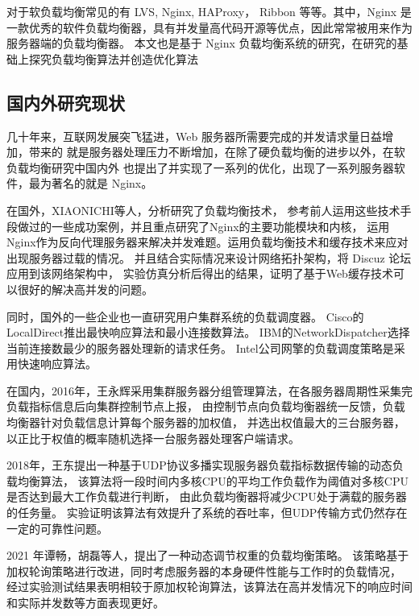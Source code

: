 对于软负载均衡常见的有 LVS\cite{lijp}, Nginx\cite{Zepeng}, HAProxy\cite{li2019dynamic}， Ribbon 等等。其中，Nginx 是一款优秀的软件负载均衡器，具有并发量高代码开源等优点，因此常常被用来作为服务器端的负载均衡器。
本文也是基于 Nginx 负载均衡系统的研究，在研究的基础上探究负载均衡算法并创造优化算法

\subsection{国内外研究现状}

几十年来，互联网发展突飞猛进，Web 服务器所需要完成的并发请求量日益增加，带来的
就是服务器处理压力不断增加，在除了硬负载均衡的进步以外，在软负载均衡研究中国内外
也提出了并实现了一系列的优化，出现了一系列服务器软件，最为著名的就是 Nginx。

在国外，XIAONICHI等人\cite{chi2012web}，分析研究了负载均衡技术，
参考前人运用这些技术手段做过的一些成功案例，并且重点研究了Nginx的主要功能模块和内核，
运用Nginx作为反向代理服务器来解决并发难题。运用负载均衡技术和缓存技术来应对出现服务器过载的情况。
并且结合实际情况来设计网络拓扑架构，将 Discuz 论坛应用到该网络架构中，
实验仿真分析后得出的结果，证明了基于Web缓存技术可以很好的解决高并发的问题。

同时，国外的一些企业也一直研究用户集群系统的负载调度器。
Cisco的LocalDirect推出最快响应算法和最小连接数算法。
IBM的NetworkDispatcher选择当前连接数最少的服务器处理新的请求任务。
Intel公司网擎的负载调度策略是采用快速响应算法\cite{张淇2020服务器集群负载均衡算法在商务系统中的研究与应用}。

在国内，2016年，王永辉采用集群服务器分组管理算法，在各服务器周期性采集完负载指标信息后向集群控制节点上报，
由控制节点向负载均衡器统一反馈，负载均衡器针对负载信息计算每个服务器的加权值，
并选出权值最大的三台服务器，以正比于权值的概率随机选择一台服务器处理客户端请求\cite{王永辉2015基于}。

2018年，王东提出一种基于UDP协议多播实现服务器负载指标数据传输的动态负载均衡算法，
该算法将一段时间内多核CPU的平均工作负载作为阈值对多核CPU是否达到最大工作负载进行判断，
由此负载均衡器将减少CPU处于满载的服务器的任务量\cite{王东2018动态反馈负载均衡策略的研究}。
实验证明该算法有效提升了系统的吞吐率，但UDP传输方式仍然存在一定的可靠性问题。

2021 年谭畅，胡磊等人\cite{谭畅2021云中心基于}，提出了一种动态调节权重的负载均衡策略。
该策略基于加权轮询策略进行改进，同时考虑服务器的本身硬件性能与工作时的负载情况，
经过实验测试结果表明相较于原加权轮询算法，该算法在高并发情况下的响应时间
和实际并发数等方面表现更好。

